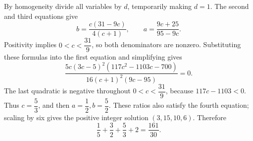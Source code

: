 By homogeneity divide all variables by $d$, temporarily making $d=1$. The second and third equations give
\[
b=\dfrac{c(31-9c)}{4(c+1)},\qquad a=\dfrac{9c+25}{95-9c}.
\]
Positivity implies $0<c<\dfrac{31}{9}$, so both denominators are nonzero. Substituting these formulas into the first equation and simplifying gives
\[
\dfrac{5c(3c-5)^2(117c^2-1103c-700)}{16(c+1)^2(9c-95)}=0.
\]
The last quadratic is negative throughout $0<c<\dfrac{31}{9}$, because $117c-1103<0$. Thus $c=\dfrac{5}{3}$, and then $a=\dfrac{1}{2},b=\dfrac{5}{2}$. These ratios also satisfy the fourth equation; scaling by six gives the positive integer solution $(3,15,10,6)$. Therefore
\[
\boxed{\dfrac{1}{5}+\dfrac{3}{2}+\dfrac{5}{3}+2=\dfrac{161}{30}}.
\]
